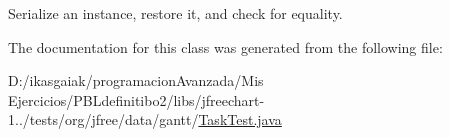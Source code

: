 Serialize an instance, restore it, and check for equality. 

The documentation for this class was generated from the following file\+:\begin{DoxyCompactItemize}
\item 
D\+:/ikasgaiak/programacion\+Avanzada/\+Mis Ejercicios/\+P\+B\+Ldefinitibo2/libs/jfreechart-\/1../tests/org/jfree/data/gantt/\mbox{\hyperlink{_task_test_8java}{Task\+Test.\+java}}\end{DoxyCompactItemize}
